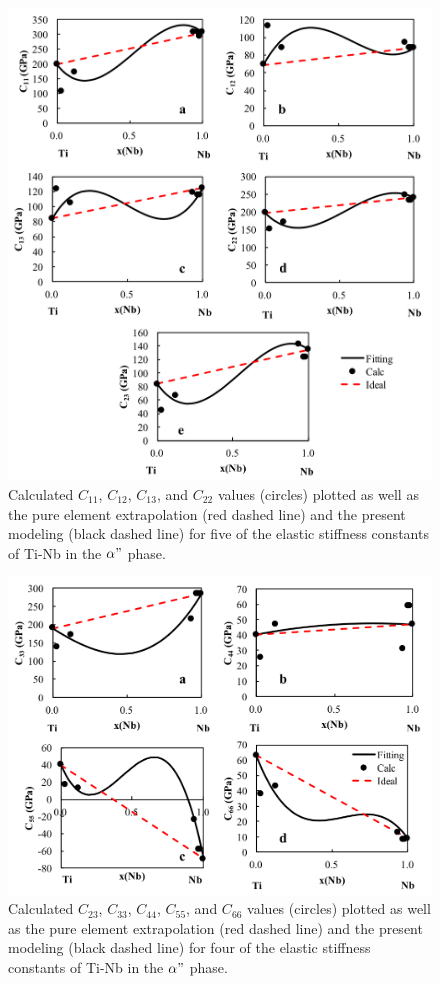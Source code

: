 \pagebreak
\begin{figure}[H]
	\centering
	\includegraphics[width=\textwidth]{Chapter-7/Figures/adpe1.png}
	\caption{Calculated $C_{11}$, $C_{12}$, $C_{13}$, and $C_{22}$ values (circles) plotted as well as the pure element extrapolation (red dashed line) and the present modeling (black dashed line) for five of the elastic stiffness constants of Ti-Nb in the $\alpha"$ phase.}
	\label{Ch7-figure:adpelas1}
\end{figure}

\pagebreak
\begin{figure}[H]
	\centering
	\includegraphics[width=\textwidth]{Chapter-7/Figures/adpe2.png}
	\caption{Calculated $C_{23}$, $C_{33}$, $C_{44}$, $C_{55}$, and $C_{66}$ values (circles) plotted as well as the pure element extrapolation (red dashed line) and the present modeling (black dashed line) for four of the elastic stiffness constants of Ti-Nb in the $\alpha"$ phase.}
	\label{Ch7-figure:adpelas2}
\end{figure}


